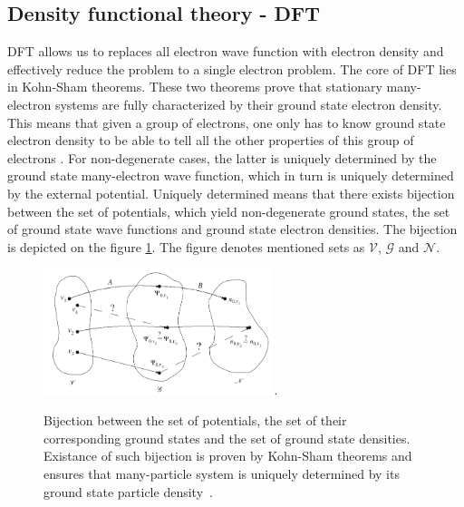 \documentclass[openany, longbibliography,slovene,a4paper,12pt]{article}
\begin{document}
\subsection{Density functional theory - DFT}
DFT allows us to replaces all electron wave function with
electron density and effectively reduce the problem to a single electron problem.
The core of DFT lies in Kohn-Sham theorems. These two theorems
prove that stationary many-electron systems are fully characterized by their
ground state electron density. This means that given a group of electrons, one
only has to know ground state electron density to be able to tell all the other
properties of this group of electrons \cite{nobel_lecture}. For non-degenerate
cases, the latter is uniquely determined by the ground state many-electron wave
function, which in turn is uniquely determined by the external potential.
Uniquely determined means that there exists bijection between the set of
potentials, which yield non-degenerate ground states, the set of ground state
wave functions and ground state electron densities. The bijection is depicted on
the figure \ref{bijection}. The figure denotes mentioned sets as $\mathcal V$,
$\mathcal G$ and $\mathcal N$.

\begin{figure}[!ht]
  \centering
  \includegraphics[width=0.6\textwidth]{bijekcija_med_v_psi_n.png}.
  \caption{Bijection between the set of potentials, the set of their corresponding ground
    states and the set of ground state densities. Existance of such bijection is proven by
    Kohn-Sham theorems and ensures that many-particle system is
    uniquely determined by its ground state particle
    density~\cite{advanced_course}.}
  \label{bijection}
\end{figure}
\end{document}
